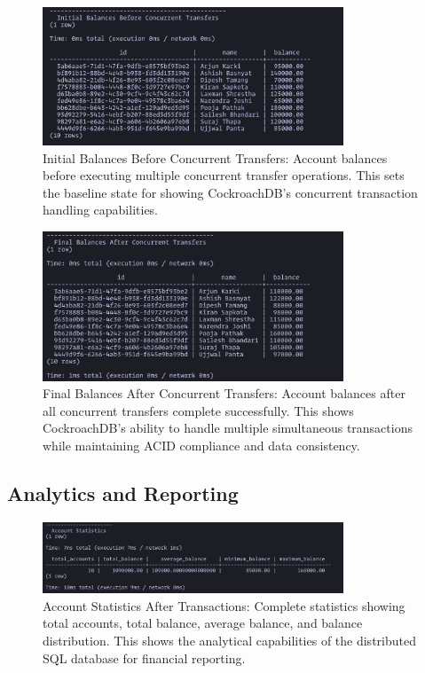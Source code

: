 \begin{figure}[H]
  \centering
  \includegraphics[width=0.8\textwidth]{task-5/screenshots/initial-before-concurrent.png}
  \caption{Initial Balances Before Concurrent Transfers: Account balances before executing multiple concurrent transfer operations. This sets the baseline state for showing CockroachDB's concurrent transaction handling capabilities.}
  \label{fig:task5-initial-before-concurrent}
\end{figure}

\begin{figure}[H]
  \centering
  \includegraphics[width=0.8\textwidth]{task-5/screenshots/final-after-concurrent.png}
  \caption{Final Balances After Concurrent Transfers: Account balances after all concurrent transfers complete successfully. This shows CockroachDB's ability to handle multiple simultaneous transactions while maintaining ACID compliance and data consistency.}
  \label{fig:task5-final-after-concurrent}
\end{figure}

\subsection*{Analytics and Reporting}

\begin{figure}[H]
  \centering
  \includegraphics[width=0.8\textwidth]{task-5/screenshots/account-stats-after-txns.png}
  \caption{Account Statistics After Transactions: Complete statistics showing total accounts, total balance, average balance, and balance distribution. This shows the analytical capabilities of the distributed SQL database for financial reporting.}
  \label{fig:task5-account-stats-after-txns}
\end{figure}

